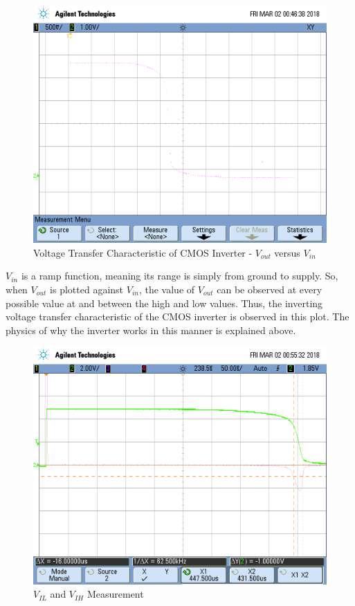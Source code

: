 \begin{figure}[h!]
	\centering
	\includegraphics[scale=0.30]{./images/vtc.png}
	\caption{Voltage Transfer Characteristic of CMOS Inverter - $V_{out}$ versus $V_{in}$}
	\label{fig:vtc.png}
\end{figure}

\FloatBarrier

$V_{in}$ is a ramp function, meaning its range is simply from ground to supply.
So, when $V_{out}$ is plotted against $V_{in}$, the value of $V_{out}$ can be observed at every possible value at and between the high and low values.
Thus, the inverting voltage transfer characteristic of the CMOS inverter is observed in this plot.
The physics of why the inverter works in this manner is explained above.

\FloatBarrier

\begin{figure}[h!]
	\centering
	\includegraphics[scale=0.30]{./images/vil_vih_measure.png}
	\caption{$V_{IL}$ and $V_{IH}$ Measurement}
	\label{fig:vil_vih_measure}
\end{figure}

